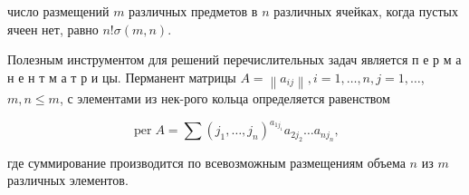 \documentclass[10pt]{article}
\begin{document}
число размещений $m$ различных предметов в $n$ различных ячейках, когда пустых ячеен нет, равно $n ! \sigma(m, n)$.



Полезным инструментом для решений перечислительных задач является п е р м а н е н т м а т р и цы. Перманент матрицы $A=\left\|a_{i j}\right\|, i=1, \ldots, n, j=1, \ldots$, $m, n \leqslant m$, с элементами из нек-рого кольца определяется равенством



\[

\operatorname{per} A=\sum\left(j_{1}, \ldots, j_{n}\right)^{a_{1 j_{1}}} a_{2 j_{2}} \ldots a_{n j_{n}},

\]



где суммирование производится по всевозможным размещениям объема $n$ из $m$ различных элементов.
\end{document}
